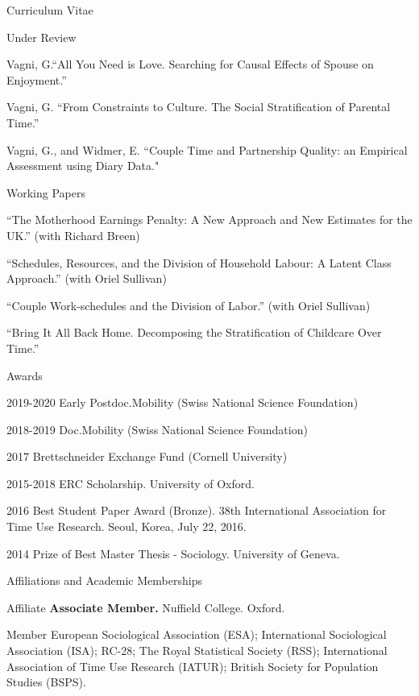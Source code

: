 \documentclass[12pt,a4paper]{article}
\begin{document}
\begin{cv}{Curriculum Vitae}
 \begin{cvlist}{Under Review}
 
   \item Vagni, G.``All You Need is Love. Searching for Causal Effects of Spouse on Enjoyment.'' 	
 	\item Vagni, G. ``From Constraints to Culture. The Social Stratification of Parental Time.'' 
 	\item Vagni, G., and Widmer, E. ``Couple Time and Partnership Quality: an Empirical Assessment using Diary Data."
 \end{cvlist}
 
 \begin{cvlist}{Working Papers}

  	\item ``The Motherhood Earnings Penalty: A New Approach and New
  	Estimates for the UK.'' (with Richard Breen)
  	\item ``Schedules, Resources, and the Division of Household Labour: A Latent Class Approach.'' (with Oriel Sullivan)
  	\item ``Couple Work-schedules and the Division of Labor.'' (with Oriel Sullivan)
  	\item ``Bring It All Back Home. Decomposing the Stratification of Childcare Over Time.''

\end{cvlist}
 
  
  \begin{cvlist}{Awards}
  	\item[2019-2020]  Early Postdoc.Mobility (Swiss National Science Foundation)
  	\item[2018-2019]  Doc.Mobility (Swiss National Science Foundation)
  	\item[2017]  Brettschneider Exchange Fund (Cornell University)
  	\item [2015-2018] ERC Scholarship. University of Oxford. 
  	\item [2016]  Best Student Paper Award (Bronze). 38th International Association for Time Use Research. Seoul, Korea, July 22, 2016. 
  	\item [2014] Prize of Best Master Thesis - Sociology.  University of Geneva. 
  \end{cvlist}
  
\begin{cvlist}{Affiliations and Academic Memberships}
	\item[Affiliate] \textbf{Associate Member.} Nuffield College. Oxford. 
	\item[Member] European Sociological Association (ESA); International Sociological Association (ISA); RC-28; The Royal Statistical Society (RSS); International Association of Time Use Research (IATUR); 
	British Society for Population Studies (BSPS). 
\end{cvlist}


\end{cv}
\end{document}
